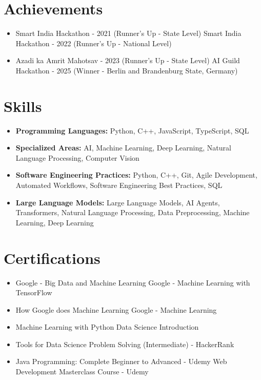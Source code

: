 \documentclass[a4paper,10pt]{article}
\begin{document}
\section*{Achievements}
\begin{itemize}
\item Smart India Hackathon - 2021 (Runner's Up - State Level) \hfill Smart India Hackathon - 2022 (Runner's Up - National Level)
\item Azadi ka Amrit Mahotsav - 2023 (Runner's Up - State Level) \hfill AI Guild Hackathon - 2025 (Winner - Berlin and Brandenburg State, Germany)
\end{itemize}

\section*{Skills}
\begin{itemize}
  \item \textbf{Programming Languages:} Python, C++, JavaScript, TypeScript, SQL
  \item \textbf{Specialized Areas:} AI, Machine Learning, Deep Learning, Natural Language Processing, Computer Vision
  \item \textbf{Software Engineering Practices:} Python, C++, Git, Agile Development, Automated Workflows, Software Engineering Best Practices, SQL
  \item \textbf{Large Language Models:} Large Language Models, AI Agents, Transformers, Natural Language Processing, Data Preprocessing, Machine Learning, Deep Learning
\end{itemize}

\section*{Certifications}
\begin{itemize}
\item Google - Big Data and Machine Learning \hfill Google - Machine Learning with TensorFlow
\item How Google does Machine Learning \hfill Google - Machine Learning
\item Machine Learning with Python \hfill Data Science Introduction
\item Tools for Data Science \hfill Problem Solving (Intermediate) - HackerRank
\item Java Programming: Complete Beginner to Advanced - Udemy \hfill Web Development Masterclass Course - Udemy
\end{itemize}
\end{document}
